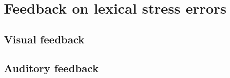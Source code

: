 %
%
\chapter{Feedback on lexical stress errors}
\label{chap:feedback}


 	\citep{Hattie2007}


%


\section{Visual feedback}
\label{sec:fb:visual}

\citep{Sitaram2011}

%	
%	
	
	
	
\section{Auditory feedback}
\label{sec:fb:auditory}

